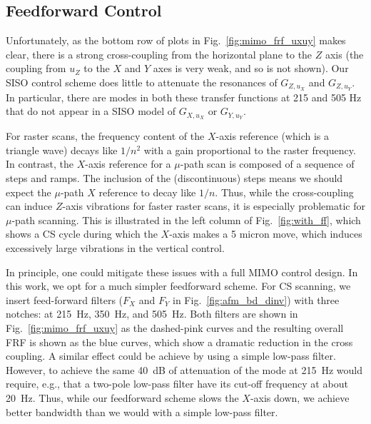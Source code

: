 \documentclass[journal]{IEEEtran}
\begin{document}

\subsection{Feedforward Control}\label{sec:ff_control}
Unfortunately, as the bottom row of plots in
Fig.~\ref{fig:mimo_frf_uxuy} makes clear, there is a strong
cross-coupling from the horizontal plane to the $Z$ axis (the coupling
from $u_Z$ to the $X$ and $Y$ axes is very weak, and so is not shown).
Our SISO control scheme does little to attenuate the resonances of
$G_{Z,u_X}$ and $G_{Z,u_Y}$. In particular, there are modes in both
these transfer functions at 215 and 505 Hz that do not appear in a
SISO model of $G_{X,u_X}$ or $G_{Y,u_Y}$.

For raster scans, the frequency content of the $X$-axis reference
(which is a triangle wave) decays like $1/n^2$ with a gain
proportional to the raster frequency. In contrast, the $X$-axis
reference for a $\mu$-path scan is composed of a sequence of steps and
ramps. The inclusion of the (discontinuous) steps means we should
expect the $\mu$-path $X$ reference to decay like $1/n$. Thus, while
the cross-coupling can induce $Z$-axis vibrations for faster raster
scans, it is especially problematic for $\mu$-path scanning. This is
illustrated in the left column of Fig.~\ref{fig:with_ff}, which shows
a CS cycle during which the $X$-axis makes a 5 micron move, which
induces excessively large vibrations in the vertical control.

In principle, one could mitigate these issues with a full MIMO control
design. In this work, we opt for a much simpler feedforward scheme.
For CS scanning, we insert feed-forward filters ($F_X$ and $F_Y$ in
Fig.~\ref{fig:afm_bd_dinv}) with three notches: at 215~Hz, 350~Hz, and
505~Hz. Both filters are shown in Fig.~\ref{fig:mimo_frf_uxuy} as the
dashed-pink curves and the
resulting overall FRF is shown as the blue curves, which show a
dramatic reduction in the cross coupling. A similar effect could be
achieve by using a simple low-pass filter. However, to achieve the
same 40~dB of attenuation of the mode at 215~Hz would require, e.g.,
that a two-pole low-pass filter have its cut-off frequency at about
20~Hz. Thus, while our feedforward scheme slows the $X$-axis down, we
achieve better bandwidth than we would with a simple low-pass filter.
\end{document}
